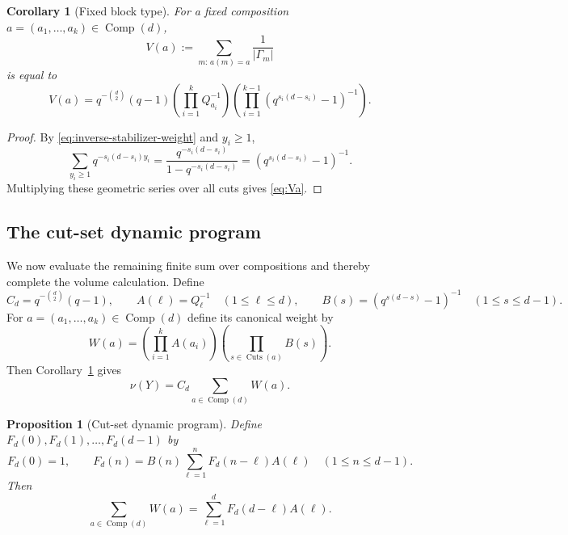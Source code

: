 \documentclass[11pt]{amsart}
\newcommand{\Comp}{\operatorname{Comp}}
\newcommand{\Cuts}{\operatorname{Cuts}}
\theoremstyle{plain}
\newtheorem{proposition}[theorem]{Proposition}
\newtheorem{corollary}[theorem]{Corollary}
\theoremstyle{definition}
\numberwithin{equation}{section}
\begin{document}
\begin{corollary}[Fixed block type]\label{cor:fixed-block}
For a fixed composition $a=(a_1,\ldots,a_k)\in\Comp(d)$,
\[
  V(a):=\sum_{m:\,a(m)=a}\frac1{|\Gamma_m|}
\]
is equal to
\begin{equation}\label{eq:Va}
  V(a)
  =q^{-\binom d2}(q-1)
  \left(\prod_{i=1}^k Q_{a_i}^{-1}\right)
  \left(\prod_{i=1}^{k-1}(q^{s_i(d-s_i)}-1)^{-1}\right).
\end{equation}
\end{corollary}

\begin{proof}
By \eqref{eq:inverse-stabilizer-weight} and $y_i\ge1$,
\[
  \sum_{y_i\ge1}q^{-s_i(d-s_i)y_i}
  =\frac{q^{-s_i(d-s_i)}}{1-q^{-s_i(d-s_i)}}
  =(q^{s_i(d-s_i)}-1)^{-1}.
\]
Multiplying these geometric series over all cuts gives \eqref{eq:Va}.
\end{proof}

\subsection{The cut-set dynamic program}

We now evaluate the remaining finite sum over compositions and thereby complete the
volume calculation.  Define
\begin{equation}\label{eq:CdAB}
  C_d=q^{-\binom d2}(q-1),
  \qquad
  A(\ell)=Q_\ell^{-1}\quad (1\le\ell\le d),
  \qquad
  B(s)=(q^{s(d-s)}-1)^{-1}\quad (1\le s\le d-1).
\end{equation}
For $a=(a_1,\ldots,a_k)\in\Comp(d)$ define its canonical weight by
\begin{equation}\label{eq:canonical-weight}
  W(a)=\left(\prod_{i=1}^k A(a_i)\right)
       \left(\prod_{s\in\Cuts(a)}B(s)\right).
\end{equation}
Then Corollary~\ref{cor:fixed-block} gives
\begin{equation}\label{eq:volume-Cd-Wsum}
  \nu(Y)=C_d\sum_{a\in\Comp(d)}W(a).
\end{equation}

\begin{proposition}[Cut-set dynamic program]\label{prop:cut-dp}
Define $F_d(0),F_d(1),\ldots,F_d(d-1)$ by
\begin{equation}\label{eq:Fd-recursion}
  F_d(0)=1,
  \qquad
  F_d(n)=B(n)\sum_{\ell=1}^nF_d(n-\ell)A(\ell)
  \quad (1\le n\le d-1).
\end{equation}
Then
\begin{equation}\label{eq:terminal-DP}
  \sum_{a\in\Comp(d)}W(a)
  =\sum_{\ell=1}^dF_d(d-\ell)A(\ell).
\end{equation}
\end{proposition}
\end{document}
